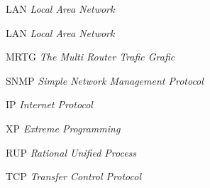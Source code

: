 
\begin{SingleSpace}

\begin{siglas}
\item[LAN] \textit{Local Area Network}
\item[LAN] \textit{Local Area Network}
\item[MRTG] \textit{The Multi Router Trafic Grafic}
\item[SNMP] \textit{Simple Network Management Protocol}
\item[IP] \textit{Internet Protocol}
\item[XP] \textit{Extreme Programming}
\item[RUP] \textit{Rational Unified Process}
\item[TCP] \textit{Transfer Control Protocol}
\end{siglas}

\end{SingleSpace}
